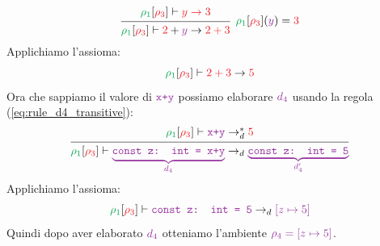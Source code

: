 \documentclass[a4paper]{article}
\begin{document}
\begin{example}
\begin{enumerate}
\begin{enumerate}
\[\begin{prooftree}
              \hypo{ 
                \mathcolor{\dOne}{\rho_1}[\mathcolor{\dThree}{\rho_3}] \vdash
                \mathcolor{\dThree}{y \to 3}
              }
              \infer1[\(
              \mathcolor{\dOne}{\rho_1}[\mathcolor{\dThree}{\rho_3}](\mathcolor{\dFour}{y})
              = \mathcolor{\dThree}{3}
              \)]{ 
                \mathcolor{\dOne}{\rho_1}[\mathcolor{\dThree}{\rho_3}] \vdash
                \mathcolor{\dThree}{2} +
                \mathcolor{\dFour}{y} \to \mathcolor{\dThree}{2}
                \mathcolor{\dThree}{+ 3}
              }
            \end{prooftree}
          \] 
          Applichiamo l'assioma:
          \[
            \mathcolor{\dOne}{\rho_1}[\mathcolor{\dThree}{\rho_3}] \vdash
            \mathcolor{\dThree}{2 + 3}
            \to \mathcolor{\dThree}{5}
          \] 
          Ora che sappiamo il valore di \( \mathcolor{\dFour}{\texttt{x+y}} \) possiamo
          elaborare \( \mathcolor{\dFour}{d_4} \) usando la regola
          (\ref{eq:rule_d4_transitive}):
          \[
            \begin{prooftree}
              \hypo{ 
                \mathcolor{\dOne}{\rho_1}[\mathcolor{\dThree}{\rho_3}] \vdash
                \mathcolor{\dFour}{\texttt{x+y}} \to_d^* \mathcolor{\dThree}{5}
              }
              \infer1{
                \mathcolor{\dOne}{\rho_1}[\mathcolor{\dThree}{\rho_3}] \vdash
                \mathcolor{\dFour}{
                  \underbrace{
                    \texttt{const z: int = x+y}
                  }_{\mathcolor{\dFour}{d_4}}
                }
                \to_d
                \mathcolor{\dFour}{
                  \underbrace{
                    \texttt{const z: int = 5}
                  }_{\mathcolor{\dFour}{d_4'}}
                }
              }
            \end{prooftree}
          \] 
          Applichiamo l'assioma:
          \[
            \mathcolor{\dOne}{\rho_1}[\mathcolor{\dThree}{\rho_3}] \vdash
            \mathcolor{\dFour}{
              \texttt{const z: int = 5}
            }
            \to_d
            \mathcolor{\dFour}{\left[ z \mapsto 5 \right]}
          \] 
          Quindi dopo aver elaborato \( \mathcolor{\dFour}{d_4} \) otteniamo
          l'ambiente \( \mathcolor{\dFour}{\rho_4 = \left[ z \mapsto 5 \right]} \).


\end{enumerate}
\end{enumerate}
\end{example}
\end{document}
